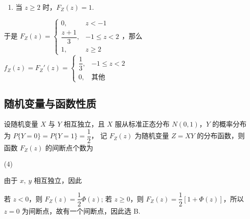 \begin{solution}
\begin{enumerate}[label=(\arabic{*})]
\begin{enumerate}[label=(\roman{*})]
                  \item 当 $z\geqslant 2$ 时，$F_Z(z)=1.$
              \end{enumerate}
              于是 $F_Z(z)=\begin{cases}
                      0,              & z<-1            \\
                      \dfrac{z+1}{3}, & -1\leqslant z<2 \\[6pt]
                      1,              & z\geqslant 2
                  \end{cases}$，那么 $f_Z(z)=F_Z'(z)=\begin{cases}
                      \dfrac{1}{3}, & -1\leqslant z<2 \\
                      0,            & \text{其他}
                  \end{cases}$
    \end{enumerate}
\end{solution}

\subsection{随机变量与函数性质}

\begin{example}[2009 数一]
    设随机变量 $ X $ 与 $ Y $ 相互独立，且 $ X $ 服从标准正态分布 $ N(0,1)$，$ Y $ 的概率分布为 $ P\{Y=0\}=   P\{Y=1\}=\dfrac{1}{2} $，
    记 $ F_{Z}(z) $ 为随机变量 $ Z=X Y $ 的分布函数，则函数 $ F_{Z}(z) $ 的间断点个数为
    \begin{tasks}(4)
    \end{tasks}
\end{example}
\begin{solution}
    由于 $x,~y$ 相互独立，因此
    若 $z<0$，则 $F_Z(z)=\dfrac{1}{2}\varPhi(z)$; 若 $z\geqslant 0$，则 $F_Z(z)=\dfrac{1}{2}[1+\varPhi(z)]$，所以 $z=0$ 为间断点，故有一个间断点，因此选 B.
\end{solution}
